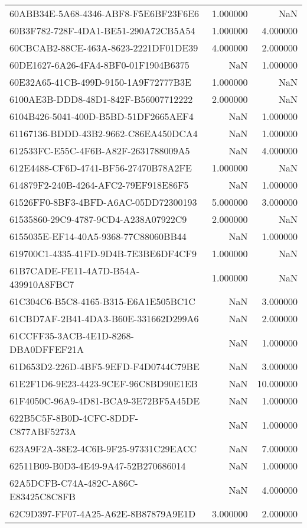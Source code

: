 \begin{tabular}{lrr}
60ABB34E-5A68-4346-ABF8-F5E6BF23F6E6 & 1.000000 & NaN \\
60B3F782-728F-4DA1-BE51-290A72CB5A54 & 1.000000 & 4.000000 \\
60CBCAB2-88CE-463A-8623-2221DF01DE39 & 4.000000 & 2.000000 \\
60DE1627-6A26-4FA4-8BF0-01F1904B6375 & NaN & 1.000000 \\
60E32A65-41CB-499D-9150-1A9F72777B3E & 1.000000 & NaN \\
6100AE3B-DDD8-48D1-842F-B56007712222 & 2.000000 & NaN \\
6104B426-5041-400D-B5BD-51DF2665AEF4 & NaN & 1.000000 \\
61167136-BDDD-43B2-9662-C86EA450DCA4 & NaN & 1.000000 \\
612533FC-E55C-4F6B-A82F-2631788009A5 & NaN & 4.000000 \\
612E4488-CF6D-4741-BF56-27470B78A2FE & 1.000000 & NaN \\
614879F2-240B-4264-AFC2-79EF918E86F5 & NaN & 1.000000 \\
61526FF0-8BF3-4BFD-A6AC-05DD72300193 & 5.000000 & 3.000000 \\
61535860-29C9-4787-9CD4-A238A07922C9 & 2.000000 & NaN \\
6155035E-EF14-40A5-9368-77C88060BB44 & NaN & 1.000000 \\
619700C1-4335-41FD-9D4B-7E3BE6DF4CF9 & 1.000000 & NaN \\
61B7CADE-FE11-4A7D-B54A-439910A8FBC7 & 1.000000 & NaN \\
61C304C6-B5C8-4165-B315-E6A1E505BC1C & NaN & 3.000000 \\
61CBD7AF-2B41-4DA3-B60E-331662D299A6 & NaN & 2.000000 \\
61CCFF35-3ACB-4E1D-8268-DBA0DFFEF21A & NaN & 1.000000 \\
61D653D2-226D-4BF5-9EFD-F4D0744C79BE & NaN & 3.000000 \\
61E2F1D6-9E23-4423-9CEF-96C8BD90E1EB & NaN & 10.000000 \\
61F4050C-96A9-4D81-BCA9-3E72BF5A45DE & NaN & 1.000000 \\
622B5C5F-8B0D-4CFC-8DDF-C877ABF5273A & NaN & 1.000000 \\
623A9F2A-38E2-4C6B-9F25-97331C29EACC & NaN & 7.000000 \\
62511B09-B0D3-4E49-9A47-52B270686014 & NaN & 1.000000 \\
62A5DCFB-C74A-482C-A86C-E83425C8C8FB & NaN & 4.000000 \\
62C9D397-FF07-4A25-A62E-8B87879A9E1D & 3.000000 & 2.000000 \\

\end{tabular}
